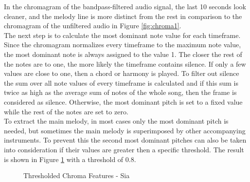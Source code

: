\noindent In the chromagram of the bandpass-filtered audio signal, the last 10 seconds look cleaner, and the melody line is more distinct from the rest in comparison to the chromagram of the unfiltered audio in Figure \ref{fig:chroma1}.\\
The next step is to calculate the most dominant note value for each timeframe. Since the chromagram normalizes every timeframe to the maximum note value, the most dominant note is always assigned to the value 1. The closer the rest of the notes are to one, the more likely the timeframe contains silence. If only a few values are close to one, then a chord or harmony is played. To filter out silence the sum over all note values of every timeframe is calculated and if this sum is twice as high as the average sum of notes of the whole song, then the frame is considered as silence. Otherwise, the most dominant pitch is set to a fixed value while the rest of the notes are set to zero.\\
\noindent To extract the main melody, in most cases only the most dominant pitch is needed, but sometimes the main melody is superimposed by other accompanying instruments. To prevent this the second most dominant pitches can also be taken into consideration if their values are greater then a specific threshold. The result is shown in Figure \ref{fig:chromavg} with a threshold of 0.8.
\begin{figure}[htbp]
	\centering
	\caption{Thresholded Chroma Features - Sia}
	\label{fig:chromavg}
\end{figure}

